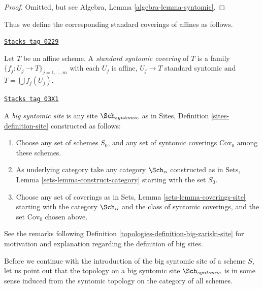 \begin{proof}
Omitted, but see Algebra, Lemma \ref{algebra-lemma-syntomic}.
\end{proof}

Thus we define the corresponding standard coverings of affines as follows.

\begin{definition}
\label{topologies-definition-standard-syntomic}
\href{https://stacks.math.columbia.edu/tag/0229}{\texttt{Stacks tag 0229}}

Let $T$ be an affine scheme. A {\it standard syntomic covering} of $T$ is
a family $\{f_j : U_j \to T\}_{j = 1, \ldots, m}$ with each $U_j$ is
affine, $U_j \to T$ standard syntomic and $T = \bigcup f_j(U_j)$.
\end{definition}

\begin{definition}
\label{topologies-definition-big-syntomic-site}
\href{https://stacks.math.columbia.edu/tag/03X1}{\texttt{Stacks tag 03X1}}

A {\it big syntomic site} is any site $\Sch_{syntomic}$ as in
Sites, Definition \ref{sites-definition-site} constructed as follows:
\begin{enumerate}
\item Choose any set of schemes $S_0$, and any set of syntomic coverings
$\text{Cov}_0$ among these schemes.
\item As underlying category take any category $\Sch_\alpha$
constructed as in Sets, Lemma \ref{sets-lemma-construct-category}
starting with the set $S_0$.
\item Choose any set of coverings as in
Sets, Lemma \ref{sets-lemma-coverings-site} starting with the
category $\Sch_\alpha$ and the class of syntomic coverings,
and the set $\text{Cov}_0$ chosen above.
\end{enumerate}
\end{definition}

See the remarks following Definition \ref{topologies-definition-big-zariski-site}
for motivation and explanation regarding the definition of big sites.

\medskip\noindent
Before we continue with the introduction of the big syntomic site of
a scheme $S$, let us point out that the topology on a big syntomic site
$\Sch_{syntomic}$ is in some sense induced from the syntomic topology
on the category of all schemes.

